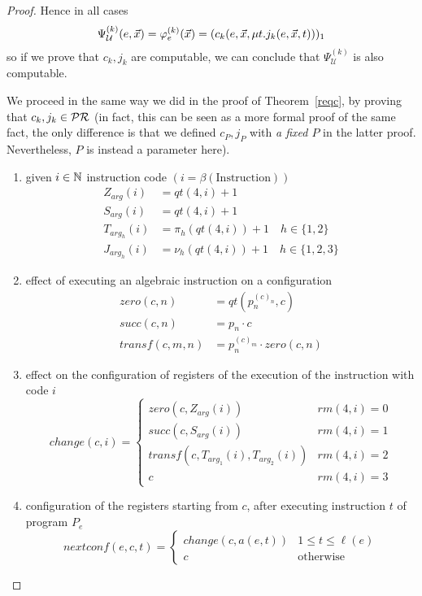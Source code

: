 \begin{theorem}
\begin{proof}
    Hence in all cases
    \[\Psi_{\mathcal{U}}^{(k)} (e, \vec{x}) = \varphi_e^{(k)}(\vec{x}) = (c_k(e,\vec{x}, \mu t . j_k(e, \vec{x}, t)))_1\]
    so if we prove that $c_k, j_k$ are computable, we can conclude that
    $\Psi_{\mathcal{U}}^{(k)}$ is also computable. 
    
    We proceed in the
    same way we did in the proof of Theorem~\ref{reqc}, by proving that
    $c_k, j_k \in \mathcal{PR}$ (in fact, this can be seen as a more formal
    proof of the same fact, the only difference is that we defined
    $c_P, j_P$ with \emph{a fixed $P$} in the latter proof.
    Nevertheless, $P$ is instead a parameter here).

    \newcommand{\uarg}{{\mathit{arg}}}
    \newcommand{\uargh}{{\mathit{arg}_h}}
    \begin{enumerate}[label=(\alph*)]
    \item given $i \in \mathbb{N}$ instruction code $( i = \beta(\mbox{Instruction}))$
      \begin{align*}
        Z_\uarg (i) &= qt(4, i) + 1 \\
        S_\uarg (i) &= qt(4,i) + 1 \\
        T_\uargh(i) &= \pi_h(qt(4,i)) + 1 \quad h \in \{1,2\} \\
        J_\uargh(i) &= \nu_h(qt(4,i)) + 1 \quad h \in \{1,2,3\}
      \end{align*}
    \item effect of executing an algebraic instruction on a configuration
      \begin{align*}
        zero(c,n) &= qt(p_n^{(c)_n}, c) \\
        succ(c,n) &= p_n \cdot c \\
        transf(c,m,n) &= p_n^{(c)_m} \cdot zero(c,n)
      \end{align*}

    \item effect on the configuration of registers of the execution of
      the instruction with code $i$
      \[
        change(c,i) = \begin{cases}
          zero(c, Z_\uarg(i)) & rm(4,i) = 0 \\
          succ(c, S_\uarg(i)) & rm(4,i) = 1 \\
          transf(c, T_{\uarg_1}(i), T_{\uarg_2}(i)) & rm(4,i) = 2 \\
          c & rm(4,i) = 3
      \end{cases}
    \]

  \item configuration of the registers starting from $c$,
    after executing instruction $t$ of program $P_e$ 
    \[
      nextconf(e,c,t) = \begin{cases}
        change(c, a(e,t)) & 1 \leq t \leq \ell(e) \\
        c & \mbox{otherwise}
      \end{cases}
    \]


\end{enumerate}
\end{proof}
\end{theorem}
